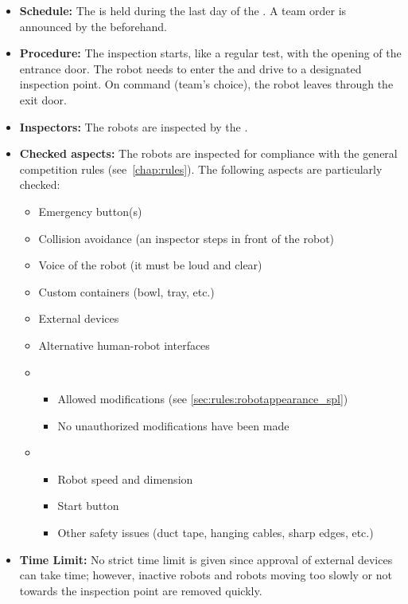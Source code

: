 \begin{itemize}
	\item \textbf{Schedule:} The \RobotInspection{} is held during the last day of the \SetupDays{}. A team order is announced by the \OC{} beforehand.
	\item \textbf{Procedure:} The inspection starts, like a regular test, with the opening of the entrance door. The robot needs to enter the \Arena{} and drive to a designated inspection point. On command (team's choice), the robot leaves through the exit door.
	\item \textbf{Inspectors:} The robots are inspected by the \TC{}.
	\item \textbf{Checked aspects:} The robots are inspected for compliance with the general competition rules (see~\ref{chap:rules}). The following aspects are particularly checked:
	\begin{itemize}
		\item Emergency button(s)
		\item Collision avoidance (an inspector steps in front of the robot)
		\item Voice of the robot (it must be loud and clear)
		\item Custom containers (bowl, tray, etc.)
		\item External devices
		\item Alternative human-robot interfaces
		\item {}
		\begin{itemize}
			\item Allowed  modifications (see \ref{sec:rules:robotappearance_spl})
			\item No unauthorized modifications have been made
		\end{itemize}
		\item {}
		\begin{itemize}
			\item Robot speed and dimension
			\item Start button
			\item Other safety issues (duct tape, hanging cables, sharp edges, etc.)
		\end{itemize}
	\end{itemize}
	\item \textbf{Time Limit:} No strict time limit is given since approval of external devices can take time; however, inactive robots and robots moving too slowly or not towards the inspection point are removed quickly.

\end{itemize}

